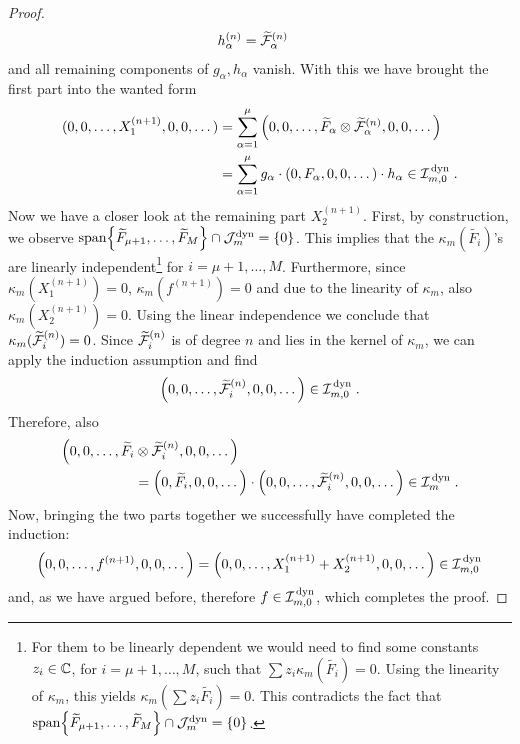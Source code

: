 \begin{proof}
\begin{align}
	h^{(n)}_{\alpha} &= \widetilde{\mathcal{F}}_\alpha^{(n)}
\end{align}
and all remaining components of $g_{\alpha}, h_{\alpha}$ vanish. With this we have brought the first part into the wanted form
\begin{align}
(0,0,\dots,X_1^{(n+1)},0,0, \dots)
&= \sum\limits_{\alpha=1}^\mu  \left(0,0,\dots,\widetilde{F}_\alpha \otimes \widetilde{\mathcal{F}}_\alpha^{(n)},0,0,\dots \right) \notag\\
&= \sum\limits_{\alpha=1}^\mu  g_{\alpha} \cdot \left(0, F_\alpha, 0 ,0,\dots \right) \cdot h_{\alpha} \in \mathcal{I}_{m,0}^\text{\,dyn} \;.
\end{align}
%
%
Now we have a closer look at the remaining part $X_2^{(n+1)}$.
First, by construction, we observe $\textrm{span}{\left\{ \widetilde{F}_{\mu+1}, \dots ,\widetilde{F}_M \right\} } \cap \mathcal{J}_m^\text{dyn} = \{ 0 \}$. This implies that the $\kappa_m(\widetilde{F_i})$'s are linearly independent\footnote{For them to be linearly dependent we would need to find some constants $z_i \in \mathbb{C}$, for $i=\mu+1,\dots,M$, such that $\sum z_i \kappa_m(\widetilde{F_i}) = 0$. Using the linearity of $\kappa_m$, this yields $\kappa_m(\sum z_i \widetilde{F_i}) =0$. This contradicts the fact that $\textrm{span}{\left\{ \widetilde{F}_{\mu+1}, \dots ,\widetilde{F}_M \right\} } \cap \mathcal{J}_m^\text{dyn} = \{ 0 \}$.} for $i=\mu+1,\dots,M$.
Furthermore, since $\kappa_m(X_1^{(n+1)}) = 0$,  $\kappa_m(f^{(n+1)}) = 0$ and due to the linearity of $\kappa_m$, also $\kappa_m(X_2^{(n+1)}) = 0$. Using the linear independence we conclude that $\kappa_m( \widetilde{\mathcal{F}}_i^{(n)}) = 0$. Since $\widetilde{\mathcal{F}}_i^{(n)}$ is of degree $n$ and lies in the kernel of $\kappa_m$, we can apply the induction assumption and find
\begin{align}
\Big(0,0,\dots, \widetilde{\mathcal{F}}_i^{(n)} , 0 , 0 , \dots \Big) \in \mathcal{I}_{m,0}^\text{\,dyn} \;.
\end{align}
Therefore, also
\begin{align}
\Big(0,0,\dots, \widetilde{F}_i &\otimes \widetilde{\mathcal{F}}_i^{(n)} , 0 , 0 , \dots \Big) \notag \\
&= \Big(0, \widetilde{F}_i , 0 , 0 , \dots \Big) \cdot \Big(0,0,\dots, \widetilde{\mathcal{F}}_i^{(n)} , 0 , 0 , \dots \Big) \in \mathcal{I}_m^\text{\,dyn} \;.
\end{align}
Now, bringing the two parts together we successfully have completed the induction:
\begin{align}
\Big(0,0,\dots, f^{(n+1)} , 0 , 0 , \dots \Big) = 	\Big(0,0,\dots, X_1^{(n+1)} + X_2^{(n+1)} , 0 , 0 , \dots \Big) \in \mathcal{I}_{m,0}^\text{\,dyn}
\end{align}
and, as we have argued before, therefore $f \in \mathcal{I}_{m,0}^\text{\,dyn}$, which completes the proof.
\end{proof}

